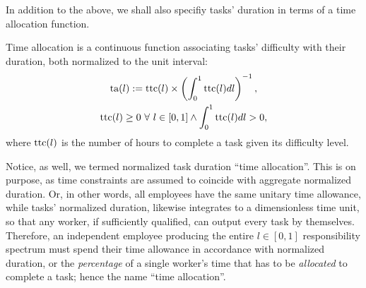 \documentclass[hidelinks, nonatbib]{elsarticle}
\begin{document}
In addition to the above, we shall also specifiy tasks' duration in terms of a time allocation function.
\begin{definition}
    \label{ta}
    Time allocation is a continuous function associating tasks' difficulty with their duration, both normalized to the unit interval:
    \begin{gather}
        \text{ta}(l)
        :=
        \text{ttc}(l)
        \times
        \left(
            \int_{0}^{1}
            \text{ttc}(l)
            dl
        \right) ^ {-1}
        ,
        \\
        \text{ttc}(l)
        \geq
        0
        \
        \forall
        \
        l \in [0,1]
        \land
        \int_{0}^{1}
            \text{ttc}(l)
            dl
            >
            0
        ,
    \end{gather}
    where $\text{ttc}(l)$ is the number of hours to complete a task given its difficulty level.
    
    Notice, as well, we termed normalized task duration ``time allocation''. This is on purpose, as time constraints are assumed to coincide with aggregate normalized duration. Or, in other words, all employees have the same unitary time allowance, while tasks' normalized duration, likewise integrates to a dimensionless time unit, so that any worker, if sufficiently qualified, can output every task by themselves. Therefore, an independent employee producing the entire $l \in [0,1]$ responsibility spectrum must spend their time allowance in accordance with normalized duration, or the \textit{percentage} of a single worker's time that has to be \textit{allocated} to complete a task; hence the name ``time allocation''.
\end{definition}
\end{document}
